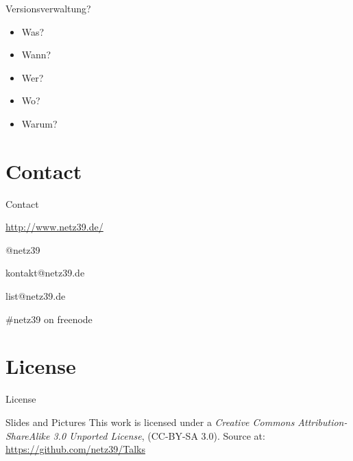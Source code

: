 \documentclass{beamer}
\begin{document}
\begin{frame}{Versionsverwaltung?}
    \begin{itemize}
        \item Was?
        \item Wann?
        \item Wer?
        \item Wo?
        \item Warum?
    \end{itemize}
\end{frame}

\section{Contact}

\begin{frame}{Contact}
    \begin{center}
        \begin{description}
            \item[WWW] \url{http://www.netz39.de/}
            \item[Twitter/identi.ca] @netz39
            \item[E-Mail] kontakt@netz39.de
            \item[Mailingliste] list@netz39.de
            \item[IRC] \#netz39 on freenode
        \end{description}
    \end{center}
\end{frame}

\appendix

\section{License}

\begin{frame}{License}
    \begin{block}{Slides and Pictures}
        This work is licensed under a \emph{Creative Commons
        Attribution-ShareAlike 3.0 Unported License}, (CC-BY-SA 3.0).
        Source at: \url{https://github.com/netz39/Talks}
    \end{block}
\end{frame}
\end{document}
